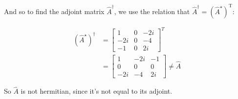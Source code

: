 \documentclass[10pt]{article}
\begin{document}
\begin{enumerate}[(a)]
\begin{solution}
        And so to find the adjoint matrix $\hat A^\dagger$, we use the relation that $\hat A^\dagger = \left(\hat A^\star\right)^{\mathrm T}$:

        \begin{align*}
            (\hat A^\star)^\dagger &= \begin{bmatrix}
                1 & 0 & -2i \\
                -2i & 0 & -4 \\
                -1 & 0 & 2i 
                \end{bmatrix}^T\\
                &= \begin{bmatrix}
                    1 & -2i & -1 \\
                    0 & 0 & 0 \\
                    -2i & -4 & 2i 
                    \end{bmatrix} \neq \hat A  
        \end{align*}

        So $\hat A$ is not hermitian, since it's not equal to its adjoint.
    \end{solution}
    \end{enumerate}
\end{document}
